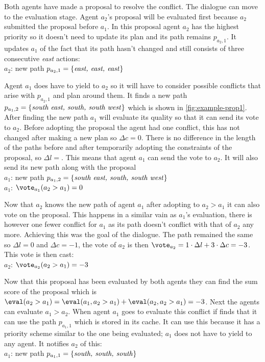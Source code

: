 Both agents have made a proposal to resolve the conflict. The dialogue can
move to the evaluation stage. Agent $a_2$'s proposal will be evaluated first
because $a_2$ submitted the proposal before $a_1$. In this proposal agent $a_2$
has the highest priority so it doesn't need to update its plan and its path
remains $p_{a_2,1}$. It updates $a_1$ of the fact that its path hasn't changed
and still consists of three consecutive \emph{east} actions:
\\ \-\qquad $a_2$: new path $p_{a_2,1} = \{\text{\emph{east, east, east}}\}$

Agent $a_1$ does have to yield to $a_2$ so it will have to consider possible
conflicts that arise with $p_{a_2,1}$ and plan around them. It finds a new path
$p_{a_1,2} = \{\text{\emph{south east, south, south west}}\}$ which is shown in
\autoref{fig:example-prop1}. After finding the new path $a_1$ will evaluate its
quality so that it can send its vote to $a_2$. Before adopting the proposal the
agent had one conflict, this has not changed after making a new plan so $\Delta
c = 0$. There is no difference in the length of the paths before and after
temporarily adopting the constraints of the proposal, so $\Delta l = $. This
means that agent $a_1$ can send the vote to $a_2$. It will also send its new
path along with the proposal
\\ \-\qquad $a_1$: new path $p_{a_1,2} = \{\text{\emph{south east, south,
south west}}\}$
\\ \-\qquad $a_1$: $\vote_{a_1}(a_2 > a_1) = 0$

Now that $a_2$ knows the new path of agent $a_1$ after adopting to $a_2 > a_1$
it can also vote on the proposal. This happens in a similar vain as $a_1$'s
evaluation, there is however one fewer conflict for $a_1$ as its path doesn't
conflict with that of $a_2$ any more. Achieving this was the goal of the
dialogue. The path remained the same so $\Delta l = 0$ and $\Delta c = -1$, the
vote of $a_2$ is then $\vote_{a_2} = 1 \cdot \Delta l + 3 \cdot \Delta c = -3$.
This vote is then cast:
\\ \-\qquad $a_2$: $\vote_{a_2}(a_2 > a_1) = -3$

Now that this proposal has been evaluated by both agents they can find the sum
score of the proposal which is $\eval(a_2 > a_1) = \eval(a_1, a_2 > a_1) +
\eval(a_2, a_2 > a_1) =
-3$. Next the agents can evaluate $a_1 > a_2$. When agent $a_1$ goes to
evaluate this conflict if finds that it can use the path $p_{a_1,1}$ which is
stored in its cache. It can use this because it has a priority scheme similar
to the one being evaluated; $a_1$ does not have to yield to any agent. It
notifies $a_2$ of this:
\\ \-\quad $a_1$: new path $p_{a_1,1} = \{\text{\emph{south, south, south}}\}$

